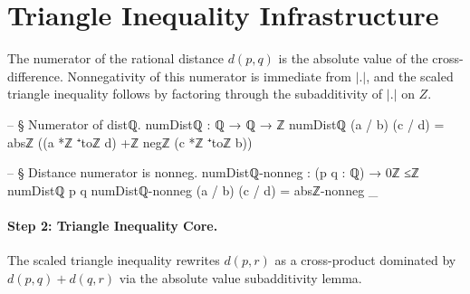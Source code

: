 \documentclass[11pt,a4paper]{book}
\def\cdot{.}%
\def\mathbb#1{#1}%
\begin{document}
\section{Triangle Inequality Infrastructure}

The numerator of the rational distance $d(p,q)$ is the absolute value of the cross-difference.
Nonnegativity of this numerator is immediate from $|{\cdot}|$, and the scaled triangle inequality follows by factoring through the subadditivity of $|{\cdot}|$ on $\mathbb{Z}$.

\begin{code}
-- § Numerator of distℚ.
numDistℚ : ℚ → ℚ → ℤ
numDistℚ (a / b) (c / d) = absℤ ((a *ℤ ⁺toℤ d) +ℤ negℤ (c *ℤ ⁺toℤ b))

-- § Distance numerator is nonneg.
numDistℚ-nonneg : (p q : ℚ) → 0ℤ ≤ℤ numDistℚ p q
numDistℚ-nonneg (a / b) (c / d) = absℤ-nonneg _
\end{code}

\paragraph{Step 2: Triangle Inequality Core.}
The scaled triangle inequality rewrites $d(p,r)$
as a cross-product dominated by $d(p,q) + d(q,r)$ via
the absolute value subadditivity lemma.
\end{document}
